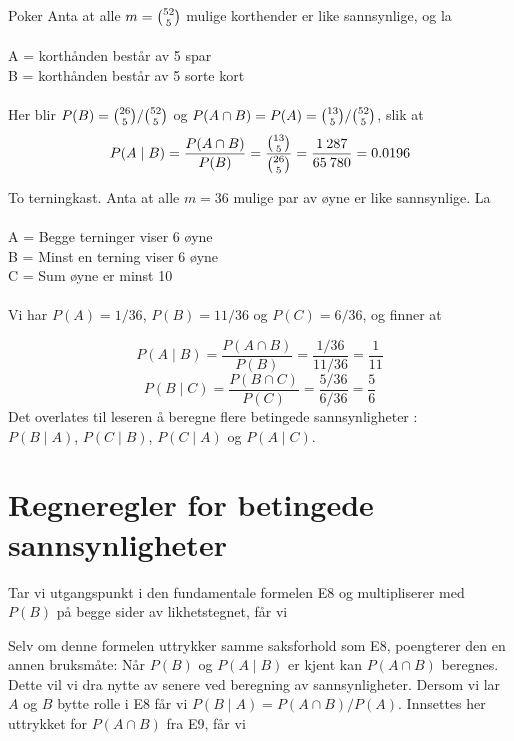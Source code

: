 \begin{eksempel}{Poker}
Anta at alle $m={{52}\choose{5}}$ mulige korthender er like sannsynlige, og la\\ \\
\indent     A = korthånden består av 5 spar \\
\indent     B = korthånden består av 5 sorte kort \\ \\
Her blir $P(B)={{26}\choose{5}}/{{52}\choose{5}}$ og
                $P(A \cap B)=P(A)={{13}\choose{5}}/{{52}\choose{5}}$, slik at
\[ P(A \mid B)=\frac{P(A \cap B)}{P(B)}=
         \frac{{{13}\choose{5}}}{{{26}\choose{5}}}=\frac{1\:287}{65\:780}=0.0196 \]
\end{eksempel}

\begin{eksempel}{To terningkast.}
Anta at alle $m=36$ mulige par av øyne er like sannsynlige. La \\  \\
\indent     A = Begge terninger viser 6 øyne \\
\indent     B = Minst en terning viser 6 øyne \\
\indent     C = Sum øyne er minst 10 \\  \\
Vi har $P(A)=1/36$, $P(B)=11/36$ og $P(C)=6/36$, og finner at

\[ P(A \mid B)=\frac{P(A \cap B)}{P(B)}=\frac{1/36}{11/36}=\frac{1}{11} \]
\[ P(B \mid C)=\frac{P(B \cap C)}{P(C)}=\frac{5/36}{6/36}=\frac{5}{6} \]
Det overlates til leseren å beregne flere betingede sannsynligheter :\\
 $P(B\mid A)$, $P(C\mid B)$, $P(C\mid A)$ og $P(A\mid C)$.
\end{eksempel}

\section{Regneregler for betingede sannsynligheter}

Tar vi utgangspunkt i den fundamentale formelen E8 og
multipliserer med $P(B)$ på begge sider av likhetstegnet, får vi 

\begin{center}  \end{center}
Selv om denne formelen uttrykker samme saksforhold som E8,
poengterer den en annen bruksmåte: Når $P(B)$ og $P(A\mid B)$ er
kjent kan $P(A\cap B)$ beregnes. Dette vil vi dra nytte av senere
ved beregning av sannsynligheter. Dersom vi lar $A$ og $B$ bytte
rolle i E8 får vi $P(B \mid A)=P(A \cap B)/P(A)$.
Innsettes her uttrykket for $P(A\cap B)$ fra E9, får vi

